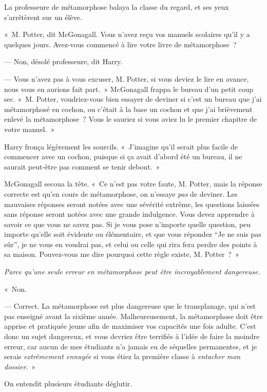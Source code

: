 La professeure de métamorphose balaya la classe du regard, et ses yeux s'arrêtèrent sur un élève.

«~M. Potter, dit McGonagall.
Vous n'avez reçu vos manuels scolaires qu'il y a quelques jours.
Avez-vous commencé à lire votre livre de métamorphose~?

--- Non, désolé professeure, dit Harry.

--- Vous n'avez pas à vous excuser, M. Potter, si vous deviez le lire en avance, nous vous en aurions fait part.~»
McGonagall frappa le bureau d'un petit coup sec.
«~M. Potter, voudriez-vous bien essayer de deviner si c'est un bureau que j'ai métamorphosé en cochon, ou c'était à la base un cochon et que j'ai brièvement enlevé la métamorphose~?
Vous le sauriez si vous aviez lu le premier chapitre de votre manuel.~»

Harry fronça légèrement les sourcils.
«~J'imagine qu'il serait plus facile de commencer avec un cochon, puisque si ça avait d'abord été un bureau, il ne saurait peut-être pas comment se tenir debout.~»

McGonagall secoua la tête.
«~Ce n'est pas votre faute, M. Potter, mais la réponse correcte est qu'en cours de métamorphose, on n'essaye \emph{pas} de deviner.
Les mauvaises réponses seront notées avec une sévérité extrême, les questions laissées sans réponse seront notées avec une grande indulgence.
Vous devez apprendre à savoir ce que vous ne savez pas.
Si je vous pose n'importe quelle question, peu importe qu'elle soit évidente ou élémentaire, et que vous répondez “Je ne suis pas sûr”, je ne vous en voudrai pas, et celui ou celle qui rira fera perdre des points à sa maison.
Pouvez-vous me dire pourquoi cette règle existe, M. Potter~?~»

\emph{Parce qu'une seule erreur en métamorphose peut être incroyablement dangereuse.}

«~Non.

--- Correct.
La métamorphose est plus dangereuse que le transplanage, qui n'est pas enseigné avant la sixième année.
Malheureusement, la métamorphose doit être apprise et pratiquée jeune afin de maximiser vos capacités une fois adulte.
C'est donc un sujet dangereux, et vous devriez être terrifiés à l'idée de faire la moindre erreur, car aucun de mes étudiants n'a jamais eu de séquelles permanentes, et je serais \emph{extrêmement ennuyée} si vous étiez la première classe à \emph{entacher mon dossier}.~»

On entendit plusieurs étudiants déglutir.

